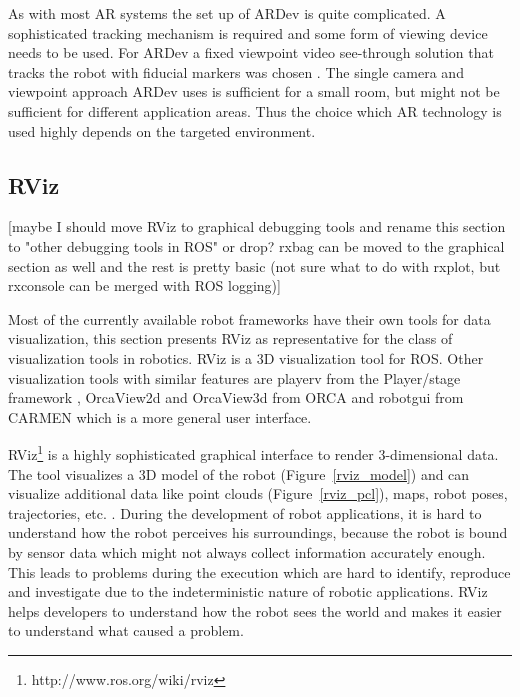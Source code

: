 As with most AR systems the set up of ARDev is quite complicated. A sophisticated tracking mechanism is required and some form of viewing device needs to be used. For ARDev a fixed viewpoint video see-through solution that tracks the robot with fiducial markers was chosen \cite{Collett2012}. The single camera and viewpoint approach ARDev uses is sufficient for a small room, but might not be sufficient for different application areas. Thus the choice which AR technology is used highly depends on the targeted environment.

\subsection{RViz}
\label{rviz}
[maybe I should move RViz to graphical debugging tools and rename this section to "other debugging tools in ROS" or drop? rxbag can be moved to the graphical section as well and the rest is pretty basic (not sure what to do with rxplot, but rxconsole can be merged with ROS logging)]

Most of the currently available robot frameworks have their own tools for data visualization, this section presents RViz as representative for the class of visualization tools in robotics. RViz is a 3D visualization tool for ROS. Other visualization tools with similar features are playerv from the Player/stage framework \cite{Gerkey2003}, OrcaView2d and OrcaView3d from ORCA \cite{Makarenko2006} and robotgui from CARMEN \cite{Montemerlo2003} which is a more general user interface.

RViz\footnote{http://www.ros.org/wiki/rviz} is a highly sophisticated graphical interface to render 3-dimensional data. The tool visualizes a 3D model of the robot (Figure~\ref{rviz_model}) and can visualize additional data like point clouds (Figure~\ref{rviz_pcl}), maps, robot poses, trajectories, etc. \cite{Quigley2009}. During the development of robot applications, it is hard to understand how the robot perceives his surroundings, because the robot is bound by sensor data which might not always collect information accurately enough. This leads to problems during the execution which are hard to identify, reproduce and investigate due to the indeterministic nature of robotic applications. RViz helps developers to understand how the robot sees the world and makes it easier to understand what caused a problem.

